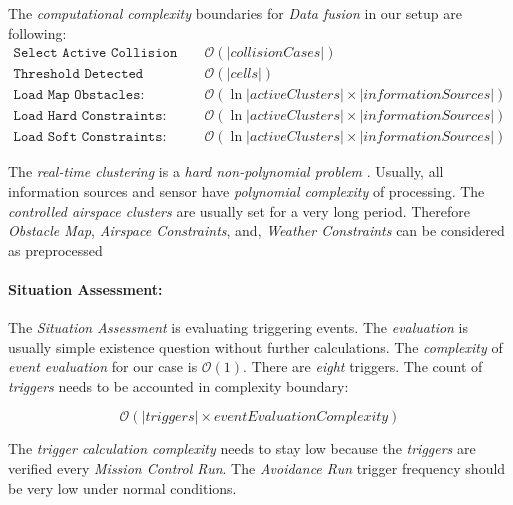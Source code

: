 \noindent The \emph{computational complexity} boundaries for \emph{Data fusion} in  our setup are following:
\begin{equation*}
    \begin{aligned}
        \texttt{Select Active Collision Cases: }& \mathscr{O} (|collision Cases|)\\
        \texttt{Threshold Detected Obstacles: }& \mathscr{O}(|cells|)\\
        \texttt{Load Map Obstacles: }& \mathscr{O}(\ln|activeClusters|\times|information Sources|)\\
        \texttt{Load Hard Constraints: }& \mathscr{O}(\ln|activeClusters|\times|information Sources|)\\
        \texttt{Load Soft Constraints: }& \mathscr{O}(\ln|activeClusters|\times|information Sources|)
    \end{aligned}
\end{equation*}

\begin{note}
    The \emph{real-time clustering} is a \emph{hard non-polynomial problem} \cite{kleinberg1998microeconomic}.  Usually, all information sources and sensor have \emph{polynomial complexity} of processing. The \emph{controlled airspace clusters} are usually set for a very long period. Therefore \emph{Obstacle Map}, \emph{Airspace Constraints}, and, \emph{Weather Constraints} can be considered as preprocessed
\end{note}

\newpage
\paragraph{Situation Assessment:} The \emph{Situation Assessment} is evaluating triggering events. The \emph{evaluation} is usually simple existence question without further calculations. The \emph{complexity} of \emph{event evaluation} for our case is $\mathscr{O}(1)$. There are \emph{eight} triggers. The count of \emph{triggers} needs to be accounted in complexity boundary:

\begin{equation*}
    \mathscr{O}(|triggers|\times event Evaluation Complexity)    
\end{equation*}

\begin{note} The \emph{trigger calculation complexity} needs to stay low because the \emph{triggers} are verified every \emph{Mission Control Run}. The \emph{Avoidance Run} trigger frequency should be very low under normal conditions.  
\end{note}


